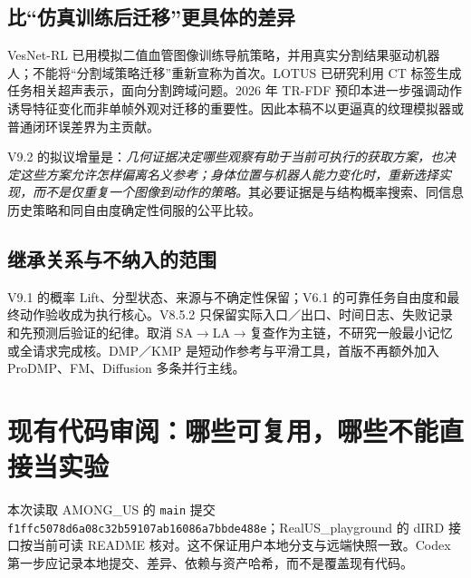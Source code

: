 \documentclass[UTF8,fontset=fandol,11pt,a4paper]{ctexart}
\theoremstyle{plain}
\theoremstyle{definition}
\theoremstyle{remark}
\numberwithin{equation}{section}
\newcommand{\code}[1]{\begingroup\small\nolinkurl{#1}\endgroup}
\begin{document}
\subsection{比“仿真训练后迁移”更具体的差异}
VesNet-RL 已用模拟二值血管图像训练导航策略，并用真实分割结果驱动机器人；不能将“分割域策略迁移”重新宣称为首次\cite{vesnet}。LOTUS 已研究利用 CT 标签生成任务相关超声表示，面向分割跨域问题\cite{lotus}。2026 年 TR-FDF 预印本进一步强调动作诱导特征变化而非单帧外观对迁移的重要性\cite{trfdf}。因此本稿不以更逼真的纹理模拟器或普通闭环误差界为主贡献。

V9.2 的拟议增量是：\emph{几何证据决定哪些观察有助于当前可执行的获取方案，也决定这些方案允许怎样偏离名义参考；身体位置与机器人能力变化时，重新选择实现，而不是仅重复一个图像到动作的策略。}其必要证据是与结构概率搜索、同信息历史策略和同自由度确定性伺服的公平比较。

\subsection{继承关系与不纳入的范围}
V9.1 的概率 Lift、分型状态、来源与不确定性保留；V6.1 的可靠任务自由度和最终动作验收成为执行核心。V8.5.2 只保留实际入口／出口、时间日志、失败记录和先预测后验证的纪律。取消 SA$\to$LA$\to$复查作为主链，不研究一般最小记忆或全请求完成核。DMP／KMP 是短动作参考与平滑工具，首版不再额外加入 ProDMP、FM、Diffusion 多条并行主线。

\section{现有代码审阅：哪些可复用，哪些不能直接当实验}
\label{sec:audit}
本次读取 AMONG\_US 的 \code{main} 提交 \code{f1ffc5078d6a08c32b59107ab16086a7bbde488e}；RealUS\_playground 的 dIRD 接口按当前可读 README 核对\cite{dmpreadme,irdreadme}。这不保证用户本地分支与远端快照一致。Codex 第一步应记录本地提交、差异、依赖与资产哈希，而不是覆盖现有代码。
\end{document}

